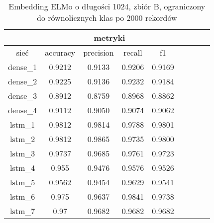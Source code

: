 \begin{table}[p] \label{tab:wyniki_elmo_B_lim} \centering
    \caption{Embedding ELMo o długości 1024, zbiór B, ograniczony do równolicznych klas po 2000 rekordów}
    \label{tab:wyniki_1024_eks3}
    \begin{tabular} {|c|c|c|c|c|c|c|c|c| }    \hline
                 & \multicolumn{4}{c|}{metryki}                                                                                  \\ \hline
        sieć     & accuracy                     & precision             & recall                     & f1                        \\ \hline
        dense\_1 & 0.9212                       & 0.9133                & 0.9206                     & 0.9169                    \\ \hline
        dense\_2 & 0.9225                       & 0.9136                & 0.9232                     & 0.9184                    \\ \hline
        dense\_3 & 0.8912                       & 0.8759                & 0.8968                     & 0.8862                    \\ \hline
        dense\_4 & 0.9112                       & 0.9050                & 0.9074                     & 0.9062                    \\ \hline
        lstm\_1  & 0.9812                       & 0.9814                & 0.9788                     & 0.9801                    \\ \hline
        lstm\_2  & 0.9812                       & 0.9865                & 0.9735                     & 0.9800                    \\ \hline
        lstm\_3  & 0.9737                       & 0.9685                & 0.9761                     & 0.9723                    \\ \hline
        lstm\_4  & 0.955                        & 0.9476                & 0.9576                     & 0.9526                    \\ \hline
        lstm\_5  & 0.9562                       & 0.9454                & 0.9629                     & 0.9541                    \\ \hline
        lstm\_6  & 0.975                        & 0.9637                & 0.9841                     & 0.9738                    \\ \hline
        lstm\_7  & 0.97                         & 0.9682                & 0.9682                     & 0.9682                    \\ \hline

\end{tabular}
\end{table}

